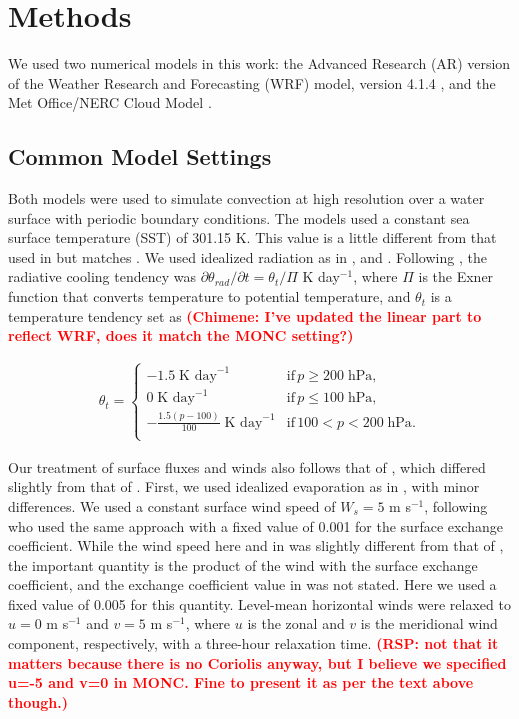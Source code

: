 \documentclass[draft]{agujournal2019}
\newcommand{\todo}[1]{\textcolor{red}{\textbf{(#1)}}}
\begin{document}
\section{Methods}
\label{sec:methods}

We used two numerical models in this work: the Advanced Research (AR) version of the
Weather Research and Forecasting (WRF) model, version 4.1.4
\cite{Skamarock_2019}, and the Met Office/NERC Cloud Model
\cite<MONC,>{Brown_2020}.

\subsection{Common Model Settings}

Both models were used to simulate convection at high resolution over a water
surface with periodic boundary conditions. The models used a constant sea
surface temperature (SST) of 301.15 K. This value is a little different from
that used in  but matches . We
used idealized radiation as in , 
and . Following , the radiative
cooling tendency was $\partial \theta_{rad} / \partial t = \theta_t/\Pi$ K
day$^{-1}$, where $\Pi$ is the Exner function that converts temperature to
potential temperature, and $\theta_t$ is a temperature tendency set as
\todo{Chimene: I've updated the linear part to reflect WRF, does it match the
MONC setting?}

\begin{align}
 \theta_t = \begin{cases}
    -1.5\; \textrm{K day}^{-1} & \textrm{if}\, p \geq 200\; \textrm{hPa}, \\
    0\; \textrm{K day}^{-1} & \textrm{if}\, p \leq 100\; \textrm{hPa}, \\
    -\frac{1.5 (p-100)}{100}\; \textrm{K day}^{-1} & \textrm{if}\, 100 < p < 200\; \textrm{hPa}. \\
 \end{cases}
\end{align}

Our treatment of surface fluxes and winds also follows that of
, which differed slightly from that of
. First, we used idealized evaporation as in
, with minor differences. We used a constant surface wind
speed of $W_s = 5$ m s$^{-1}$, following  who used the
same approach with a fixed value of 0.001 for the surface exchange coefficient.
While the wind speed here and in  was slightly different
from that of , the important quantity is the product of
the wind with the surface exchange coefficient, and the exchange coefficient
value in  was not stated. Here we used a fixed value of
0.005 for this quantity. Level-mean horizontal winds were relaxed to $u = 0$ m
s$^{-1}$ and $v = 5$ m s$^{-1}$, where $u$ is the zonal and $v$ is the
meridional wind component, respectively, with a three-hour relaxation time. \todo{RSP: not that it matters because there is no Coriolis anyway, but I believe we specified u=-5 and v=0 in MONC. Fine to present it as per the text above though.}
\end{document}
